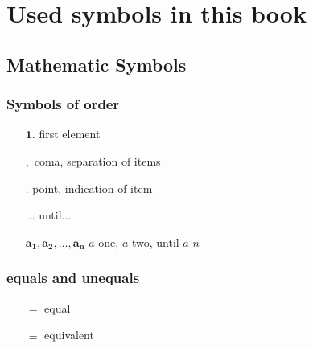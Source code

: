 \section{Used symbols in this book}
\subsection{Mathematic Symbols}
\subsubsection{Symbols of order}
\begin{itemize}
\item[$\mathbf{1.}$] first element
\item[$\mathbf{,}$] coma, separation of items 
\item[$\mathbf{.}$] point, indication of item
\item[$\mathbf{\dots}$] until...
\item[$\mathbf{a_1,a_2,\dots ,a_n}$] $a$ one, $a$ two, until $a$ $n$
\end{itemize}
\subsubsection{equals and unequals}
\begin{itemize}
\item[$\mathbf{=}$] equal
\item[$\mathbf{\equiv}$] equivalent
\end{itemize}

